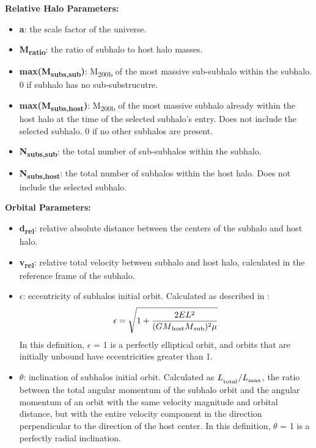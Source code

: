 \documentclass[fleqn,usenatbib]{mnras}
\begin{document}
    \noindent\textbf{Relative Halo Parameters:}
    \begin{itemize} [leftmargin=.4cm,topsep=0pt]
        \item \textbf{a}: the scale factor of the universe.
        \item \textbf{M\textsubscript{ratio}}: the ratio of subhalo to host halo masses.
         \item \textbf{max(M\textsubscript{subs,sub})}: M\textsubscript{200b} of the most massive sub-subhalo within the subhalo. 0 if subhalo has no sub-substrucutre. 
        \item \textbf{max(M\textsubscript{subs,host})}: M\textsubscript{200b} of the most massive subhalo already within the host halo at the time of the selected subhalo's entry. Does not include the selected subhalo. 0 if no other subhalos are present.
        \item \textbf{N\textsubscript{subs,sub}}: the total number of sub-subhalos within the subhalo.
        \item \textbf{N\textsubscript{subs,host}}:  the total number of subhalos within the host halo. Does not include the selected subhalo.
    \end{itemize}
\vskip 0.1in
    \noindent\textbf{Orbital Parameters:}
    \begin{itemize} [leftmargin=.4cm,topsep=0pt]
        \item \textbf{d\textsubscript{rel}}: relative absolute distance between the centers of the subhalo and host halo.
        \item \textbf{v\textsubscript{rel}}: relative total velocity between subhalo and host halo, calculated in the reference frame of the subhalo.
        \item \boldmath$\epsilon$\unboldmath: eccentricity of subhalos initial orbit. Calculated as described in \citet{Wetzel2011}:
        \begin{equation}
            \epsilon = \sqrt{1 + \frac{2EL^2}{(GM\textsubscript{host}M\textsubscript{sub})^2\mu}}
        \end{equation}
        In this definition, $\epsilon$ = 1 is a perfectly elliptical orbit, and orbits that are initially unbound have eccentricities greater than 1.
        \item \boldmath$\theta$\unboldmath: inclination of subhalos initial orbit. Calculated as $L_\textsubscript{total}/L_\textsubscript{max}$, the ratio between the total angular momentum of the subhalo orbit and the angular momentum of an orbit with the same velocity magnitude and orbital distance, but with the entire velocity component in the direction perpendicular to the direction of the host center. In this definition, $\theta$ = 1 is a perfectly radial inclination.
    \end{itemize}
\end{document}
